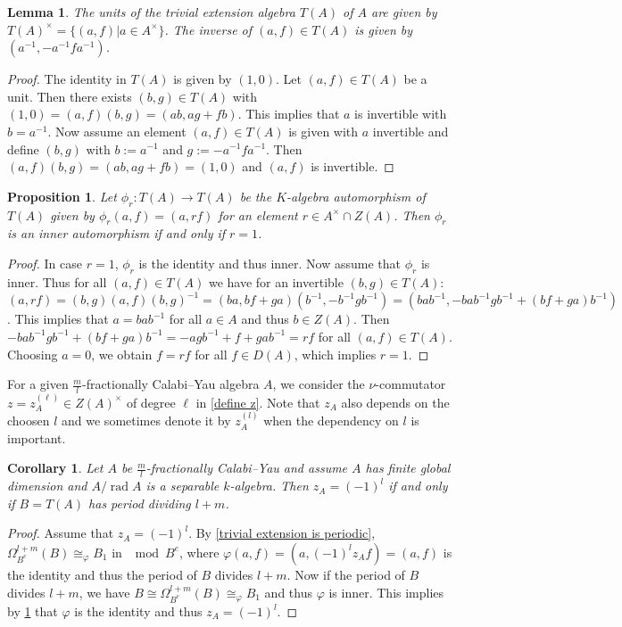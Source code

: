 \documentclass[a4paper,reqno,11pt]{amsart}
\newtheorem{corollary}[theorem]{Corollary}
\newtheorem{lemma}[theorem]{Lemma}
\newtheorem{proposition}[theorem]{Proposition}
\theoremstyle{definition}
\newcommand{\rad}{\operatorname{rad}\nolimits}
\newcommand{\new}[1]{{\blue #1}}
\numberwithin{equation}{section}
\begin{document}
\begin{lemma}
The units of the trivial extension algebra $T(A)$ of $A$ are given by $T(A)^\times = \{ (a,f) | a \in A^\times \}$.
The inverse of $(a,f) \in T(A)$ is given by $(a^{-1}, -a^{-1}f a^{-1})$.
\end{lemma}
\begin{proof}
The identity in $T(A)$ is given by $(1,0)$.
Let $(a,f) \in T(A)$ be a unit. Then there exists $(b,g) \in T(A)$ with
$(1,0)=(a,f)(b,g)=(ab,ag+fb)$. This implies that $a$ is invertible with $b=a^{-1}$. 
Now assume an element $(a,f) \in T(A)$ is given with $a$ invertible and define $(b,g)$ with $b:=a^{-1}$ and $g:=-a^{-1}f a^{-1}$.
Then $(a,f)(b,g)=(ab,ag+fb)=(1,0)$ and $(a,f)$ is invertible.
\end{proof}

\begin{proposition} \label{inneriffidentity}
Let $\phi_r: T(A) \rightarrow T(A)$ be the $K$-algebra automorphism of $T(A)$ given by $\phi_r(a,f)=(a,rf)$ for an element $r \in A^\times \cap Z(A)$.
Then $\phi_r$ is an inner automorphism if and only if $r=1$.
\end{proposition}

\begin{proof}
In case $r=1$, $\phi_r$ is the identity and thus inner.
Now assume that $\phi_r$ is inner. 
Thus for all $(a,f) \in T(A)$ we have for an invertible $(b,g) \in T(A)$:
$(a,rf)=(b,g)(a,f)(b,g)^{-1}=(ba,bf+ga)(b^{-1},-b^{-1}gb^{-1})=(bab^{-1},-bab^{-1}gb^{-1}+(bf+ga) b^{-1})$.
This implies that $a=bab^{-1}$ for all $a \in A$ and thus $b \in Z(A)$.
Then $-bab^{-1}gb^{-1}+(bf+ga) b^{-1}=-agb^{-1}+f+gab^{-1}=rf$ for all $(a,f) \in T(A)$.
Choosing $a=0$, we obtain $f=r f$ for all $f \in D(A)$, which implies $r=1$.

\end{proof}

For a given $\frac{m}{l}$-fractionally Calabi--Yau algebra $A$, we \new{consider the $\nu$-commutator $z=z_A^{(\ell)}\in  Z(A)^\times$ of degree $\ell$ in \eqref{define z}.} Note that $z_A$ also depends on the choosen $l$ and we sometimes denote it by $z_A^{(l)}$ when the dependency on $l$ is important. 

\begin{corollary} \label{periodcorollary}
Let $A$ be $\frac{m}{l}$-fractionally Calabi--Yau and assume $A$ has finite global dimension and $A/\rad A$ is a separable $k$-algebra.
Then $z_A=(-1)^l$ if and only if $B=T(A)$ has period dividing $l+m$.

\end{corollary}
\begin{proof}
Assume that $z_A=(-1)^l$. By \ref{trivial extension is periodic}, $\Omega_{B^e}^{l+m}(B) \cong _{\varphi}B_1$ in $\mod B^e$, where 
$\varphi(a,f)=(a,(-1)^l z_A f)=(a,f)$ is the identity and thus the period of $B$ divides $l+m$.
Now if the period of $B$ divides $l+m$, we have $B \cong \Omega_{B^e}^{l+m}(B) \cong _{\varphi}B_1$ and thus $\varphi$ is inner. This implies by \ref{inneriffidentity} that $\varphi$ is the identity and thus $z_A=(-1)^l$.
\end{proof}
\end{document}
